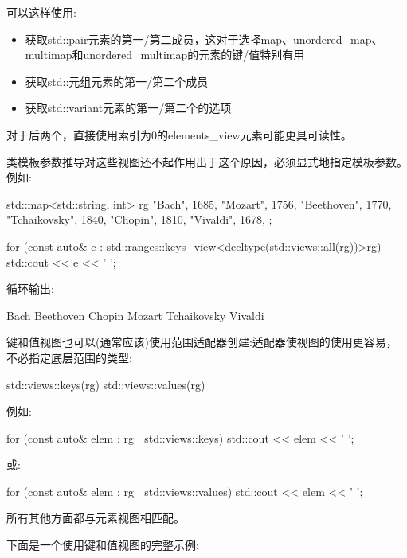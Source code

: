 可以这样使用:

\begin{itemize}
\item
获取std::pair元素的第一/第二成员，这对于选择map、unordered\_map、multimap和unordered\_multimap的元素的键/值特别有用

\item
获取std::元组元素的第一/第二个成员

\item
获取std::variant元素的第一/第二个的选项
\end{itemize}

对于后两个，直接使用索引为0的elements\_view元素可能更具可读性。

类模板参数推导对这些视图还不起作用出于这个原因，必须显式地指定模板参数。例如:

\begin{cpp}
std::map<std::string, int> rg{
	{"Bach", 1685}, {"Mozart", 1756}, {"Beethoven", 1770},
	{"Tchaikovsky", 1840}, {"Chopin", 1810}, {"Vivaldi", 1678},
};

for (const auto& e : std::ranges::keys_view<decltype(std::views::all(rg))>{rg}) {
	std::cout << e << ' ';
}
\end{cpp}

循环输出:

\begin{shell}
Bach Beethoven Chopin Mozart Tchaikovsky Vivaldi
\end{shell}


键和值视图也可以(通常应该)使用范围适配器创建:适配器使视图的使用更容易，不必指定底层范围的类型:

\begin{cpp}
std::views::keys(rg)
std::views::values(rg)
\end{cpp}

例如:

\begin{cpp}
for (const auto& elem : rg | std::views::keys) {
	std::cout << elem << ' ';
}
\end{cpp}

或:

\begin{cpp}
for (const auto& elem : rg | std::views::values) {
	std::cout << elem << ' ';
}
\end{cpp}

所有其他方面都与元素视图相匹配。

下面是一个使用键和值视图的完整示例:

